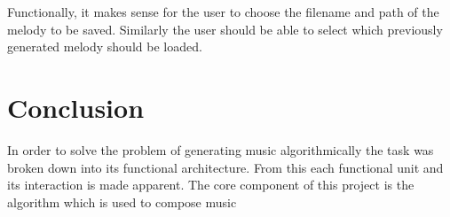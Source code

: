 Functionally, it makes sense for the user to choose the filename and path of the melody to be saved. Similarly the user should be able to select which previously generated melody should be loaded.

\chapter{Conclusion}
In order to solve the problem of generating music algorithmically the task was broken down into its functional architecture. From this each functional unit and its interaction is made apparent. The core component of this project is the algorithm which is used to compose music